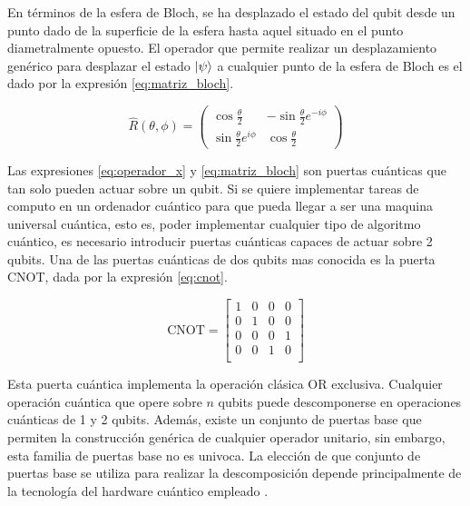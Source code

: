 En términos de la esfera de Bloch, se ha desplazado el estado del qubit desde un punto dado de la superficie de la esfera hasta aquel situado en el punto diametralmente opuesto. El operador que permite realizar un desplazamiento genérico para desplazar el estado $\ket{\psi}$ a cualquier punto de la esfera de Bloch es el dado por la expresión \ref{eq:matriz_bloch}.

\begin{equation}
    \hat{R}(\theta, \phi) = 
    \begin{pmatrix}
        \cos{\frac{\theta}{2}} & -\sin{\frac{\theta}{2}}e^{-i\phi} \\
        \sin{\frac{\theta}{2}}e^{i\phi} & \cos{\frac{\theta}{2}}
    \end{pmatrix}
    \label{eq:matriz_bloch}
\end{equation}

Las expresiones \ref{eq:operador_x} y \ref{eq:matriz_bloch} son puertas cuánticas que tan solo pueden actuar sobre un qubit. Si se quiere implementar tareas de computo en un ordenador cuántico para que pueda llegar a ser una maquina universal cuántica, esto es, poder implementar cualquier tipo de algoritmo cuántico, es necesario introducir puertas cuánticas capaces de actuar sobre 2 qubits. Una de las puertas cuánticas de dos qubits mas conocida es la puerta CNOT, dada por la expresión \ref{eq:cnot}.

\newpage

\begin{equation}
    \text{CNOT} = \begin{bmatrix}
    1 & 0 & 0 & 0 \\
    0 & 1 & 0 & 0 \\
    0 & 0 & 0 & 1 \\
    0 & 0 & 1 & 0 \\
    \end{bmatrix}
    \label{eq:cnot}
\end{equation}

Esta puerta cuántica implementa la operación clásica OR exclusiva. Cualquier operación cuántica que opere sobre $n$ qubits puede descomponerse en operaciones cuánticas de 1 y 2 qubits. Además, existe un conjunto de puertas base que permiten la construcción genérica de cualquier operador unitario, sin embargo, esta familia de puertas base no es univoca. La elección de que conjunto de puertas base se utiliza para realizar la descomposición depende principalmente de la tecnología del hardware cuántico empleado \citep{lin}. \\

